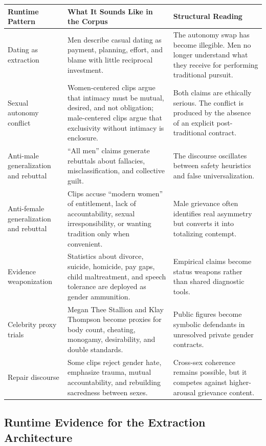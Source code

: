 \documentclass[12pt]{article}
\begin{document}
\begin{longtable}{p{} p{} p{}}
\toprule
\textbf{Runtime Pattern} & \textbf{What It Sounds Like in the Corpus} & \textbf{Structural Reading} \\
\midrule
\endhead
Dating as extraction & Men describe casual dating as payment, planning, effort, and blame with little reciprocal investment. & The autonomy swap has become illegible. Men no longer understand what they receive for performing traditional pursuit. \\
\addlinespace
Sexual autonomy conflict & Women-centered clips argue that intimacy must be mutual, desired, and not obligation; male-centered clips argue that exclusivity without intimacy is enclosure. & Both claims are ethically serious. The conflict is produced by the absence of an explicit post-traditional contract. \\
\addlinespace
Anti-male generalization and rebuttal & ``All men'' claims generate rebuttals about fallacies, misclassification, and collective guilt. & The discourse oscillates between safety heuristics and false universalization. \\
\addlinespace
Anti-female generalization and rebuttal & Clips accuse ``modern women'' of entitlement, lack of accountability, sexual irresponsibility, or wanting tradition only when convenient. & Male grievance often identifies real asymmetry but converts it into totalizing contempt. \\
\addlinespace
Evidence weaponization & Statistics about divorce, suicide, homicide, pay gaps, child maltreatment, and speech tolerance are deployed as gender ammunition. & Empirical claims become status weapons rather than shared diagnostic tools. \\
\addlinespace
Celebrity proxy trials & Megan Thee Stallion and Klay Thompson become proxies for body count, cheating, monogamy, desirability, and double standards. & Public figures become symbolic defendants in unresolved private gender contracts. \\
\addlinespace
Repair discourse & Some clips reject gender hate, emphasize trauma, mutual accountability, and rebuilding sacredness between sexes. & Cross-sex coherence remains possible, but it competes against higher-arousal grievance content. \\
\bottomrule
\end{longtable}

\subsection{Runtime Evidence for the Extraction Architecture}
\end{document}
